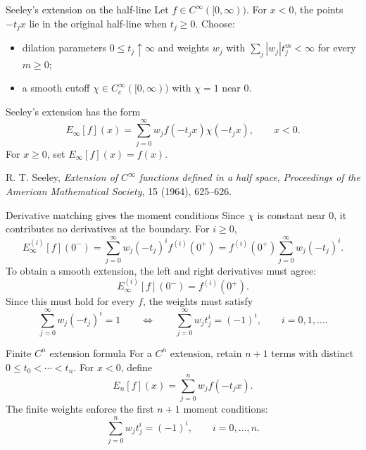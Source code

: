 \documentclass[aspectratio=169,11pt]{beamer}
\begin{document}
\begin{frame}{Seeley's extension on the half-line}
\small
Let $f\in C^\infty([0,\infty))$. For $x<0$, the points $-t_jx$ lie in the
original half-line when $t_j\ge 0$. Choose:
\begin{itemize}
  \item dilation parameters $0\le t_j\uparrow\infty$ and weights $w_j$ with
  $\sum_j|w_j|t_j^m<\infty$ for every $m\ge0$;
  \item a smooth cutoff $\chi\in C_c^\infty([0,\infty))$ with
  $\chi=1$ near $0$.
\end{itemize}
Seeley's extension has the form
\[
  E_\infty[f](x)
  =
  \sum_{j=0}^{\infty}w_j f(-t_jx)\chi(-t_jx),
  \qquad x<0.
\]
For $x\ge0$, set $E_\infty[f](x)=f(x)$.

\vfill
\scriptsize R. T. Seeley, \emph{Extension of $C^\infty$ functions defined in a half space},
\emph{Proceedings of the American Mathematical Society}, 15 (1964), 625--626.
\end{frame}

\begin{frame}{Derivative matching gives the moment conditions}
\small
Since $\chi$ is constant near $0$, it contributes no derivatives at the
boundary. For $i\ge0$,
\[
  E_\infty^{(i)}[f](0^-)
  =
  \sum_{j=0}^{\infty}w_j(-t_j)^i f^{(i)}(0^+)
  =
  f^{(i)}(0^+)\sum_{j=0}^{\infty}w_j(-t_j)^i.
\]
To obtain a smooth extension, the left and right derivatives must agree:
\[
  E_\infty^{(i)}[f](0^-)=f^{(i)}(0^+).
\]
Since this must hold for every $f$, the weights must satisfy
\[
  \sum_{j=0}^{\infty}w_j(-t_j)^i=1
  \qquad\Longleftrightarrow\qquad
  \sum_{j=0}^{\infty}w_jt_j^i=(-1)^i,
  \qquad i=0,1,\ldots.
\]
\end{frame}

\begin{frame}{Finite $C^n$ extension formula}
\small
For a $C^n$ extension, retain $n+1$ terms with distinct
$0\le t_0<\cdots<t_n$. For $x<0$, define
\[
  E_n[f](x)=
  \sum_{j=0}^n w_j f(-t_jx).
\]
The finite weights enforce the first $n+1$ moment conditions:
\[
  \sum_{j=0}^n w_jt_j^i=(-1)^i,
  \qquad i=0,\ldots,n.
\]
\end{frame}
\end{document}
